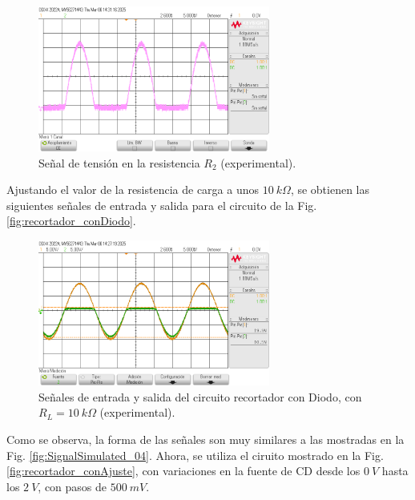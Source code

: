 \documentclass[journal]{IEEEtran}
\begin{document}
\begin{figure}[H]
        \centering
        \includegraphics[width=3in]{SignalExperimental_04.png}
        \caption{Señal de tensión en la resistencia $R_2$ (experimental).}
        \label{fig:SignalExperimental_04}
\end{figure}

Ajustando el valor de la resistencia de carga a unos $10~k\Omega$, se obtienen las siguientes señales de entrada y salida para el circuito de la Fig. \ref{fig:recortador_conDiodo}.
\begin{figure}[H]
        \centering
        \includegraphics[width=3in]{SignalExperimental_05.png}
        \caption{Señales de entrada y salida del circuito recortador con Diodo, con $R_L=10~k\Omega$ (experimental).}
        \label{fig:SignalExperimental_05}
\end{figure}

Como se observa, la forma de las señales son muy similares a las mostradas en la Fig. \ref{fig:SignalSimulated_04}. Ahora, se utiliza el ciruito mostrado en la Fig. \ref{fig:recortador_conAjuste}, 
con variaciones en la fuente de CD desde los $0~V$ hasta los $2~V$, con pasos de $500~mV$.
\end{document}
